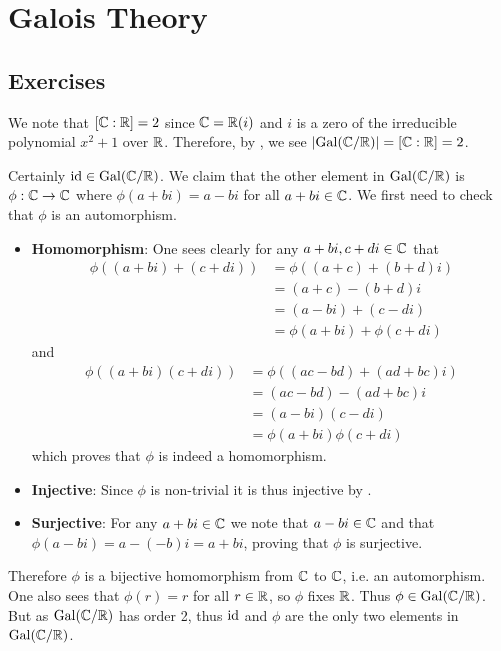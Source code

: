 \section{Galois Theory}
\subsection*{Exercises}
\begin{questions}
    \item \begin{partquestions}{\roman*}
        \item We note that $[\mathbb{C}:\mathbb{R}] = 2$ since $\mathbb{C} = \mathbb{R}(i)$ and $i$ is a zero of the irreducible polynomial $x^2 + 1$ over $\mathbb{R}$. Therefore, by , we see $|\mathrm{Gal}(\mathbb{C}/\mathbb{R})| = [\mathbb{C}:\mathbb{R}] = 2$.

        \item Certainly $\mathrm{id} \in \mathrm{Gal}(\mathbb{C}/\mathbb{R})$. We claim that the other element in $\mathrm{Gal}(\mathbb{C}/\mathbb{R})$ is $\phi: \mathbb{C} \to \mathbb{C}$ where $\phi(a+bi) = a-bi$ for all $a+bi \in \mathbb{C}$. We first need to check that $\phi$ is an automorphism.
        \begin{itemize}
            \item \textbf{Homomorphism}: One sees clearly for any $a+bi, c+di \in \mathbb{C}$ that
            \begin{align*}
                \phi((a+bi)+(c+di)) &= \phi((a+c)+(b+d)i)\\
                &= (a+c)-(b+d)i\\
                &= (a-bi) + (c-di)\\
                &= \phi(a+bi) + \phi(c+di)
            \end{align*}
            and
            \begin{align*}
                \phi((a+bi)(c+di)) &= \phi((ac-bd) + (ad+bc)i)\\
                &= (ac-bd) - (ad+bc)i\\
                &= (a-bi)(c-di)\\
                &= \phi(a+bi)\phi(c+di)
            \end{align*}
            which proves that $\phi$ is indeed a homomorphism.

            \item \textbf{Injective}: Since $\phi$ is non-trivial it is thus injective by .

            \item \textbf{Surjective}: For any $a + bi \in \mathbb{C}$ we note that $a - bi \in \mathbb{C}$ and that $\phi(a - bi) = a - (-b)i = a+bi$, proving that $\phi$ is surjective.
        \end{itemize}
        Therefore $\phi$ is a bijective homomorphism from $\mathbb{C}$ to $\mathbb{C}$, i.e. an automorphism. One also sees that $\phi(r) = r$ for all $r \in \mathbb{R}$, so $\phi$ fixes $\mathbb{R}$. Thus $\phi \in \mathrm{Gal}(\mathbb{C}/\mathbb{R})$. But as $\mathrm{Gal}(\mathbb{C}/\mathbb{R})$ has order 2, thus $\mathrm{id}$ and $\phi$ are the only two elements in $\mathrm{Gal}(\mathbb{C}/\mathbb{R})$.
    \end{partquestions}


\end{questions}
